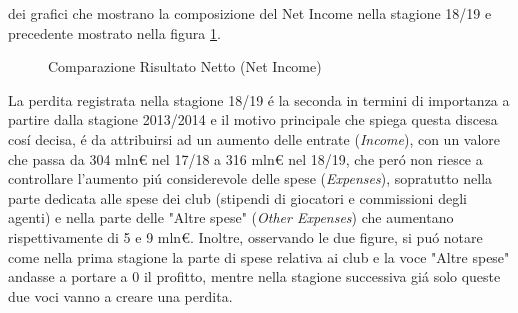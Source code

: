 \documentclass[
    corpo=11.5pt,
    oneside,
    evenboxes,
    tipotesi=triennale,
    stile=classica,
    oldstyle,
    autoretitolo,
    greek,
]{toptesi}
\begin{document}
\begin{interlinea}{1.5}
dei grafici che mostrano la composizione del Net Income nella stagione 18/19 e precedente mostrato nella figura \ref{comp_income}.
\begin{figure}
    \centering
     \quad
    \caption{Comparazione Risultato Netto (Net Income)}
    \label{comp_income}  
\end{figure}

La perdita registrata nella stagione 18/19 \'e la seconda in termini di importanza a partire dalla stagione 2013/2014 e
il motivo principale che spiega questa discesa cos\'i decisa, \'e da attribuirsi ad un aumento delle entrate (\emph{Income}),
con un valore che passa da 304 mln€ nel 17/18 a 316 mln€ nel 18/19, che per\'o non riesce a controllare l'aumento pi\'u considerevole
delle spese (\emph{Expenses}), sopratutto nella parte dedicata alle spese dei club (stipendi di giocatori e commissioni degli agenti) 
e nella parte delle "Altre spese" (\emph{Other Expenses}) che aumentano rispettivamente di 5 e 9 mln€. Inoltre, osservando le due figure,
si pu\'o notare come nella prima stagione la parte di spese relativa ai club e la voce "Altre spese" andasse a portare a 0 il profitto,
mentre nella stagione successiva gi\'a solo queste due voci vanno a creare una perdita.\\
\end{interlinea}
\end{document}
